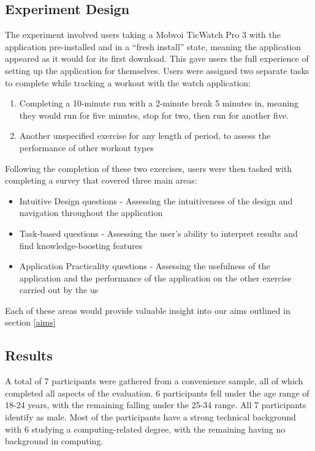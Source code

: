 \documentclass{l4proj}
\begin{document}
\subsection{Experiment Design}
\label{sec:userstudydesign}

The experiment involved users taking a Mobvoi TicWatch Pro 3 with the application pre-installed and in a “fresh install” state, meaning the application appeared as it would for its first download. This gave users the full experience of setting up the application for themselves. Users were assigned two separate tasks to complete while tracking a workout with the watch application:

\begin{enumerate}
    \item Completing a 10-minute run with a 2-minute break 5 minutes in, meaning they would run for five minutes, stop for two, then run for another five.
    \item Another unspecified exercise for any length of period, to assess the performance of other workout types
\end{enumerate}
Following the completion of these two exercises, users were then tasked with completing a survey that covered three main areas:

\begin{itemize}
    \item Intuitive Design questions - Assessing the intuitiveness of the design and navigation throughout the application
    \item Task-based questions - Assessing the user’s ability to interpret results and find knowledge-boosting features
    \item Application Practicality questions - Assessing the usefulness of the application and the performance of the application on the other exercise carried out by the us
\end{itemize}

Each of these areas would provide valuable insight into our aims outlined in section \ref{aims}

\subsection{Results}
\label{sec:userstudyresults}

A total of 7 participants were gathered from a convenience sample, all of which completed all aspects of the evaluation. 6 participants fell under the age range of 18-24 years, with the remaining falling under the 25-34 range. All 7 participants identify as male. Most of the participants have a strong technical background with 6 studying a computing-related degree, with the remaining having no background in computing.
\end{document}
